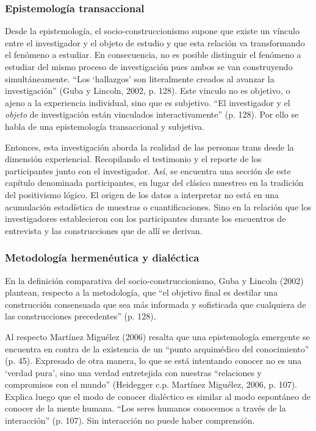 \subsubsection{Epistemología transaccional}
Desde la epistemología, el socio-construccionismo supone que existe un vínculo
entre el investigador y el objeto de estudio y que esta relación va
transformando el fenómeno a estudiar.
En consecuencia, no es posible distinguir el fenómeno a estudiar del mismo
proceso de investigación pues ambos se van construyendo simultáneamente.
“Los ‘hallazgos’ son literalmente creados al avanzar la investigación” (Guba y
Lincoln, 2002, p. 128).
Este vinculo no es objetivo, o ajeno a la experiencia individual, sino que es
subjetivo.
“El investigador y el \emph{objeto} de investigación están vinculados
interactivamente”
(p. 128).
Por ello se habla de una epistemología transaccional y subjetiva.

Entonces, esta investigación aborda la realidad de las personas trans desde la
dimensión experiencial.
Recopilando el testimonio y el reporte de los participantes junto con el
investigador.
Así, se encuentra una sección de este capítulo denominada participantes, en
lugar del clásico muestreo en la tradición del positivismo lógico.
El origen de los datos a interpretar no está en una acumulación estadística de
muestras o cuantificaciones.
Sino en la relación que los investigadores establecieron con los participantes
durante los encuentros de entrevista y las construcciones que de allí se
derivan.

\subsubsection{Metodología hermenéutica y dialéctica}
En la definición comparativa del socio-construccionismo, Guba y Lincoln (2002)
plantean, respecto a la metodología, que “el objetivo final es destilar una
construcción consensuada que sea más informada y sofisticada que cualquiera de
las construcciones precedentes” (p. 128).

Al respecto Martínez Miguélez (2006) resalta que una epistemología emergente se
encuentra en contra de la existencia de un “punto arquimédico del conocimiento”
(p. 45).
Expresado de otra manera, lo que se está intentando conocer no es una ‘verdad
pura’, sino una verdad entretejida con nuestras “relaciones y compromisos con el
mundo” (Heidegger c.p. Martínez Miguélez, 2006, p. 107).
Explica luego que el modo de conocer dialéctico es similar al modo espontáneo de
conocer de la mente humana.
“Los seres humanos conocemos a través de la interacción” (p. 107).
Sin interacción no puede haber comprensión.

